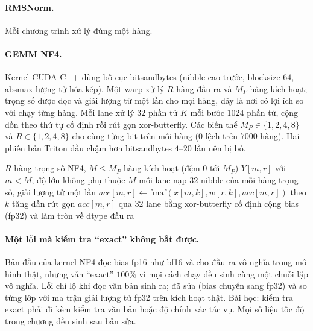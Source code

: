 \paragraph{RMSNorm.} Mỗi chương trình xử lý đúng một hàng.

\paragraph{GEMM NF4.} Kernel CUDA C++ dùng bố cục bitsandbytes (nibble cao trước, blocksize $64$, absmax lượng tử hóa kép). Một warp xử lý $R$ hàng đầu ra và $M_P$ hàng kích hoạt; trọng số được đọc và giải lượng tử một lần cho mọi hàng, đây là nơi có lợi ích so với chạy từng hàng. Mỗi lane xử lý $32$ phần tử $K$ mỗi bước $1024$ phần tử, cộng dồn  theo thứ tự cố định rồi rút gọn xor-butterfly. Các biến thể $M_P\in\{1,2,4,8\}$ và $R\in\{1,2,4,8\}$ cho cùng từng bit trên mỗi hàng ($0$ lệch trên $7000$ hàng). Hai phiên bản Triton đầu chậm hơn bitsandbytes $4$--$20$ lần nên bị bỏ.

\begin{algorithm}[t]
\caption{Kernel GEMM NF4 bất biến theo $M$ (một warp).}\label{alg:nf4}
\begin{algorithmic}[1]
\Require $R$ hàng trọng số NF4, $M\le M_P$ hàng kích hoạt (đệm $0$ tới $M_P$)
\Ensure $Y[m,r]$ với $m<M$, độ lớn không phụ thuộc $M$
 
  \State mỗi lane nạp $32$ nibble của mỗi hàng trọng số, giải lượng tử một lần
    \State $acc[m,r] \gets \mathrm{fmaf}(x[m,k], w[r,k], acc[m,r])$ theo $k$ tăng dần
  \EndFor
\EndFor
\State rút gọn $acc[m,r]$ qua $32$ lane bằng xor-butterfly cố định
\State cộng bias (fp32) và làm tròn về dtype đầu ra
\end{algorithmic}
\end{algorithm}

\paragraph{Một lỗi mà kiểm tra ``exact'' không bắt được.} Bản đầu của kernel NF4 đọc bias fp16 như bf16 và cho đầu ra vô nghĩa trong mô hình thật, nhưng vẫn ``exact'' $100\%$ vì mọi cách chạy đều sinh cùng một chuỗi lặp vô nghĩa. Lỗi chỉ lộ khi đọc văn bản sinh ra; đã sửa (bias chuyển sang fp32) và so từng lớp với ma trận giải lượng tử fp32 trên kích hoạt thật. Bài học: kiểm tra exact phải đi kèm kiểm tra văn bản hoặc độ chính xác tác vụ. Mọi số liệu tốc độ trong chương đều sinh sau bản sửa.

